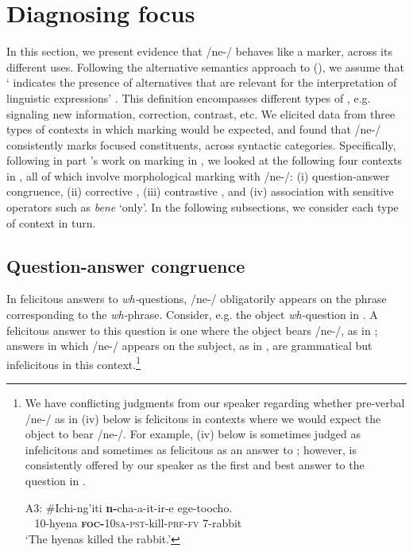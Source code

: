 \documentclass[output=paper,modfonts]{langscibook}
\begin{document}
\section{Diagnosing focus}\label{sec:landmann:3}


In this section, we present evidence that /ne-/ behaves like a  marker, across its different uses. Following the alternative semantics approach to  (\citealt{Rooth1985,Rooth1992}), we assume that ‘ indicates the presence of alternatives that are relevant for the interpretation of linguistic expressions’ \citep{Krifka2008}. This definition encompasses different types of , e.g. signaling new information, correction, contrast, etc. We elicited data from three types of contexts in which  marking would be expected, and found that /ne-/ consistently marks focused constituents, across syntactic categories. Specifically, following in part \citet{HartmannZimmermann2009}’s work on  marking in , we looked at the following four  contexts in , all of which involve morphological marking with /ne-/:
(i) question-answer congruence, 
(ii) corrective ,
(iii) contrastive , and 
(iv) association with  sensitive operators such as  \textit{bene} ‘only’. In the following subsections, we consider each type of  context in turn.

\subsection{Question-answer congruence}
\largerpage[-2]


In felicitous answers to \textit{wh-}questions, /ne-/ obligatorily appears on the phrase corresponding to the \textit{wh-}phrase. Consider, e.g. the object \textit{wh-}question in . A felicitous answer to this question is one where the object bears /ne-/, as in ; answers in which /ne-/ appears on the subject, as in , are grammatical but infelicitous in this context.\footnote{%
    We have conflicting judgments from our speaker regarding whether pre-verbal /ne-/ as in (iv) below is felicitous in contexts where we would expect the object to bear /ne-/. For example, (iv) below is sometimes judged as infelicitous and sometimes as felicitous as an answer to ; however,  is consistently offered by our speaker as the first and best answer to the question in .

    \ea
      \gll A3: \#Ichi-ng’iti \textbf{n-}cha-a-it-ir-e ege-toocho.\\
    ~ 10-hyena \textsc{\textbf{foc}}\textbf{-}\textsc{10sa}-\textsc{pst}-kill-\textsc{prf}-\textsc{fv} 7-rabbit\\
    \glt ‘The hyenas killed the rabbit.’
    \z
}
\end{document}
